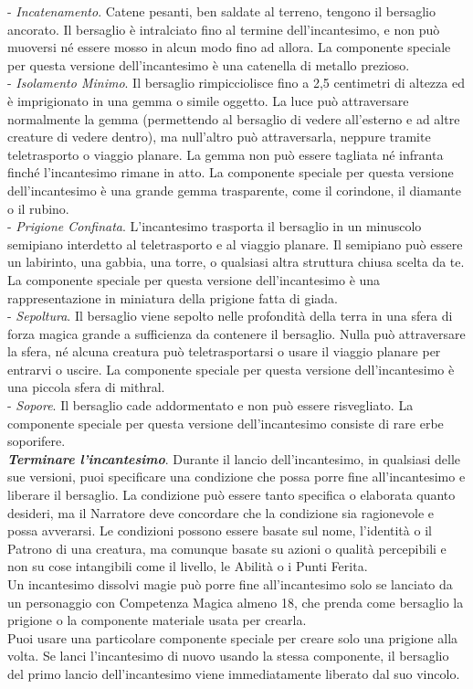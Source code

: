 \begin{multicols}{2}
- \textit{Incatenamento}. Catene pesanti, ben saldate al terreno, tengono il bersaglio ancorato. Il bersaglio è intralciato fino al termine dell'incantesimo, e non può muoversi né essere mosso in alcun modo fino ad allora. La componente speciale per questa versione dell'incantesimo è una catenella di metallo prezioso.\\
- \textit{Isolamento Minimo}. Il bersaglio rimpicciolisce fino a 2,5 centimetri di altezza ed è imprigionato in una gemma o simile oggetto. La luce può attraversare normalmente la gemma (permettendo al bersaglio di vedere all'esterno e ad altre creature di vedere dentro), ma null'altro può attraversarla, neppure tramite teletrasporto o viaggio planare. La gemma non può essere tagliata né infranta finché l'incantesimo rimane in atto. La componente speciale per questa versione dell'incantesimo è una grande gemma trasparente, come il corindone, il diamante o il rubino.\\
- \textit{Prigione Confinata}. L'incantesimo trasporta il bersaglio in un minuscolo semipiano interdetto al teletrasporto e al viaggio planare. Il semipiano può essere un labirinto, una gabbia, una torre, o qualsiasi altra struttura chiusa scelta da te. La componente speciale per questa versione dell'incantesimo è una rappresentazione in miniatura della prigione fatta di giada.\\
- \textit{Sepoltura}. Il bersaglio viene sepolto nelle profondità della terra in una sfera di forza magica grande a sufficienza da contenere il bersaglio. Nulla può attraversare la sfera, né alcuna creatura può teletrasportarsi o usare il viaggio planare per entrarvi o uscire. La componente speciale per questa versione dell'incantesimo è una piccola sfera di mithral.\\
- \textit{Sopore}. Il bersaglio cade addormentato e non può essere risvegliato. La componente speciale per questa versione dell'incantesimo consiste di rare erbe soporifere.\\

\medskip
\textit{\textbf{Terminare l'incantesimo}}. Durante il lancio dell'incantesimo, in qualsiasi delle sue versioni, puoi specificare una condizione che possa porre fine all'incantesimo e liberare il bersaglio. La condizione può essere tanto specifica o elaborata quanto desideri, ma il Narratore deve concordare che la condizione sia ragionevole e possa avverarsi. Le condizioni possono essere basate sul nome, l'identità o il Patrono di una creatura, ma comunque basate su azioni o qualità percepibili e non su cose intangibili come il livello, le Abilità o i Punti Ferita.\\
Un incantesimo dissolvi magie può porre fine all'incantesimo solo se lanciato da un personaggio con Competenza Magica almeno 18, che prenda come bersaglio la prigione o la componente materiale usata per crearla.\\
Puoi usare una particolare componente speciale per creare solo una prigione alla volta. Se lanci l'incantesimo di nuovo usando la stessa componente, il bersaglio del primo lancio dell'incantesimo viene immediatamente liberato dal suo vincolo.


\end{multicols}
